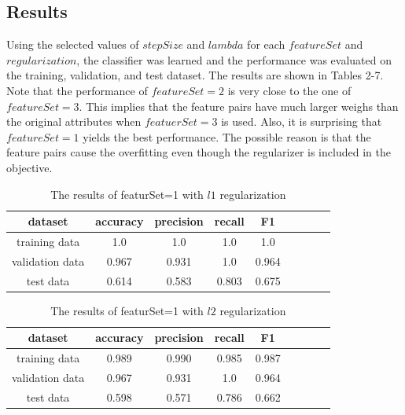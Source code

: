 \subsection*{Results}
Using the selected values of $stepSize$ and $lambda$ for each $featureSet$ and $regularization$, the classifier was learned and the performance was evaluated on the training, validation, and test dataset. The results are shown in Tables 2-7. Note that the performance of $featureSet=2$ is very close to the one of $featureSet=3$. This implies that the feature pairs have much larger weighs than the original attributes when $featuerSet=3$ is used. Also, it is surprising that $featureSet=1$ yields the best performance. The possible reason is that the feature pairs cause the overfitting even though the regularizer is included in the objective.

\begin{table}[!h]
  \begin{center}
  \begin{tabular}{|c|c|c|c|c|c|c|c|c|} \hline
    dataset & accuracy & precision & recall & F1 \\ \hline
    training data & 1.0 & 1.0 & 1.0 & 1.0 \\ \hline
    validation data & 0.967 & 0.931 & 1.0 & 0.964 \\ \hline
    test data & 0.614 & 0.583 & 0.803 & 0.675 \\ \hline
  \end{tabular}
  \caption{The results of featurSet=1 with $l1$ regularization}
  \label{tab:result_1_l1}
  \end{center}
\end{table}

\begin{table}[!h]
  \begin{center}
  \begin{tabular}{|c|c|c|c|c|c|c|c|c|} \hline
    dataset & accuracy & precision & recall & F1 \\ \hline
    training data & 0.989 & 0.990 & 0.985 & 0.987 \\ \hline
    validation data & 0.967 & 0.931 & 1.0 & 0.964 \\ \hline
    test data & 0.598 & 0.571 & 0.786 & 0.662 \\ \hline
  \end{tabular}
  \caption{The results of featurSet=1 with $l2$ regularization}
  \label{tab:result_1_l2}
  \end{center}
\end{table}

